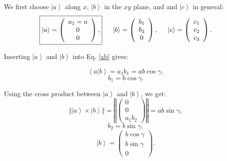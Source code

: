 We first choose $\left| a \right>$ along $x$, $\left| b \right>$ in the $xy$ plane, and and $\left| c \right>$ in general:
\begin{equation} 
	\boxed{ \left| a \right> = \left( \begin{array}{c} a_1 = a \\ 0 \\ 0 \end{array} \right), }
	\hspace{0.5cm} \left| b \right> = \left( \begin{array}{c} b_1 \\ b_2 \\ 0 \end{array} \right),
	\hspace{0.5cm} \left| c \right> = \left( \begin{array}{c} c_1 \\ c_2 \\ c_3 \end{array} \right).
\end{equation}


Inserting $\left| a \right>$ and $\left| b \right>$ into Eq. \ref{ab} gives:

\begin{equation} \left< a | b \right > = a_1 b_1 = ab \cos \gamma, \end{equation}
\begin{equation} b_1 = b \cos \gamma. \end{equation}


Using the cross product between $\left| a \right>$ and $\left| b \right>$, we get:
\begin{equation} 
	\left\Vert \left| a \right> \times \left| b \right> \right\Vert =
	\left\Vert \left( \begin{array}{c} 0 \\ 0 \\ a_1 b_2 \end{array} \right) \right\Vert =
	ab \sin \gamma, \label{crossab}
\end{equation}
\begin{equation} b_2 = b \sin \gamma, \end{equation}
\begin{equation} 
\boxed{ \left| b \right> = \left( \begin{array}{c} b \cos \gamma \\ b \sin \gamma \\ 0 \end{array} \right). } 
\label{bvec} 
\end{equation}



